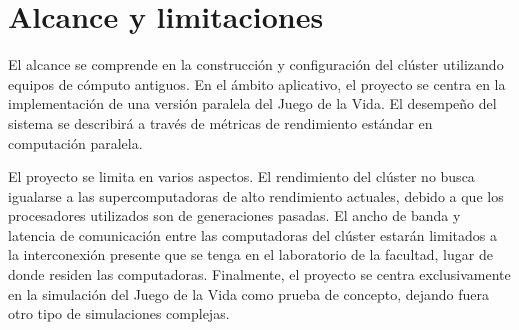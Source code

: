 \section{Alcance y limitaciones}
\label{section:alclim}

El alcance se comprende en la construcción y configuración del clúster utilizando equipos de cómputo antiguos. En el ámbito aplicativo, el proyecto se centra en la implementación de una versión paralela del Juego de la Vida. El desempeño del sistema se describirá a través de métricas de rendimiento estándar en computación paralela.

El proyecto se limita en varios aspectos. El rendimiento del clúster no busca igualarse a las supercomputadoras de alto rendimiento actuales, debido a que los procesadores utilizados son de generaciones pasadas. El ancho de banda y latencia de comunicación entre las computadoras del clúster estarán limitados a la interconexión presente que se tenga en el laboratorio de la facultad, lugar de donde residen las computadoras. Finalmente, el proyecto se centra exclusivamente en la simulación del Juego de la Vida como prueba de concepto, dejando fuera otro tipo de simulaciones complejas.